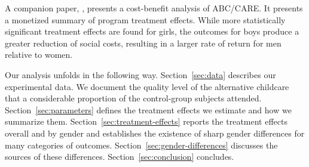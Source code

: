 
A companion paper, \citet{Garcia_Heckman_Leaf_etal_2017_Comp_CBA_Unpublished}, presents a cost-benefit analysis of ABC/CARE. It presents a monetized summary of program treatment effects. While more statistically significant treatment effects are found for girls, the outcomes for boys produce a greater reduction of social costs, resulting in a larger rate of return for men relative to women.

Our analysis unfolds in the following way. Section~\ref{sec:data} describes our experimental data. We document the quality level of the alternative childcare that a considerable proportion of the control-group subjects attended. Section~\ref{sec:parameters} defines the treatment effects we estimate and how we summarize them. Section~\ref{sec:treatment-effects} reports the treatment effects overall and by gender and establishes the existence of sharp gender differences for many categories of outcomes. Section~\ref{sec:gender-differences} discusses the sources of these differences. Section~\ref{sec:conclusion} concludes.
